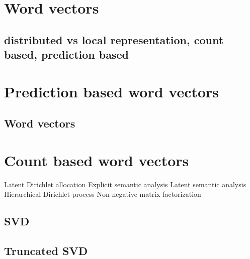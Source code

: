         \* %
        
        
        
        
        
    \section{Word vectors}
        \subsection{distributed vs local representation, count based, prediction based}
        \cite{Rubenstein:1965:CCS:365628.365657} %
        \cite{maas2011learning} %

    \section{Prediction based word vectors}
        \subsection{Word vectors}
        \cite{DBLP:journals/corr/MikolovSCCD13} %
        \cite{DBLP:conf/icml/LeM14} %
        \cite{rong2014word2vec} %
        \cite{pennington2014glove} %




    \section{Count based word vectors}
        \cite{wiemer2004latent} %
        Latent Dirichlet allocation
        Explicit semantic analysis
        Latent semantic analysis
        Hierarchical Dirichlet process
        Non-negative matrix factorization
        \subsection{SVD}
        {}
        \subsection{Truncated SVD}
